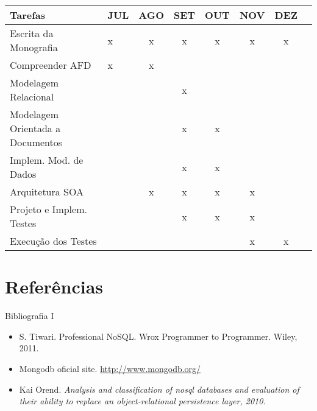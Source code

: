 \begin{frame}
\begin{changemargin}{-1cm}{-1cm} 
\begin{table}[h]
	\begin{center}
	\begin{tabular}{ p{4cm}lcccccc}
		\hline
			\textbf{Tarefas} & \textbf{JUL} & \textbf{AGO} & \textbf{SET} & \textbf{OUT} & \textbf{NOV} & \textbf{DEZ}\\
		\hline
			Escrita da Monografia & x & x & x & x & x & x\\
			Compreender AFD & x & x &  &  &  & \\
			Modelagem Relacional &  &  & x &  &  & \\
			Modelagem Orientada a  Documentos &  &  & x & x &  & \\
			Implem. Mod. de Dados &  &  & x & x &  & \\
			Arquitetura SOA &  & x & x & x & x & \\
			Projeto e Implem. Testes &  &  & x & x & x & \\
			Execução dos Testes &  &  &  &  & x & x\\
		\hline
	\end {tabular}
	\end{center}
\end{table}
\end{changemargin}
\end{frame}

\section{Referências}

\begin{frame}{Bibliografia I}
\begin{itemize}

\item S. Tiwari. Professional NoSQL. Wrox Programmer to Programmer. Wiley, 2011.

\item Mongodb oficial site. \url{http://www.mongodb.org/}

\item Kai Orend. \textit{Analysis and classification of nosql databases and evaluation of their
ability to replace an object-relational persistence layer, 2010.}

\end{itemize}
\end{frame}

